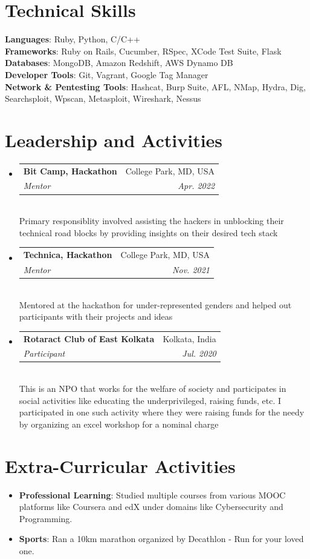 \documentclass[letterpaper,11pt]{article}
\makeatletter
\newcommand{\resumeSubheading}[4]{
  \vspace{-2pt}\item
    \begin{tabular*}{0.97\textwidth}[t]{l@{\extracolsep{\fill}}r}
      \textbf{#1} & #2 \\
      \textit{\small#3} & \textit{\small #4} \\
    \end{tabular*}\vspace{-7pt}
}
\newcommand{\resumeSubHeadingListStart}{\begin{itemize}[leftmargin=0.15in, label={}]}
\newcommand{\resumeSubHeadingListEnd}{\end{itemize}}
\makeatother
\begin{document}
\section{Technical Skills}
 \begin{itemize}[leftmargin=0.15in, label={}]
    \small{\item{
     \textbf{Languages}{: Ruby, Python, C/C++ } \\
     \textbf{Frameworks}{: Ruby on Rails, Cucumber, RSpec, XCode Test Suite, Flask } \\
     \textbf{Databases}{: MongoDB, Amazon Redshift, AWS Dynamo DB } \\
     \textbf{Developer Tools}{: Git, Vagrant, Google Tag Manager } \\
     \textbf{Network \& Pentesting Tools}{: Hashcat, Burp Suite, AFL, NMap, Hydra, Dig, Searchsploit, Wpscan, Metasploit, Wireshark, Nessus }
    }}
 \end{itemize}

\section{Leadership and Activities}
 \resumeSubHeadingListStart
  \resumeSubheading
     {Bit Camp, Hackathon}{College Park, MD, USA}
     {Mentor}{Apr. 2022} \vspace{2px} \\
     {Primary responsiblity involved assisting the hackers in unblocking their technical road blocks by providing insights on their desired tech stack}
  \resumeSubheading
     {Technica, Hackathon}{College Park, MD, USA}
     {Mentor}{Nov. 2021} \vspace{2px} \\
     {Mentored at the hackathon for under-represented genders and helped out participants with their projects and ideas}
  \resumeSubheading
     {Rotaract Club of East Kolkata}{Kolkata, India}
     {Participant}{Jul. 2020} \vspace{2px} \\
     {This is an NPO that works for the welfare of society and participates in social activities like educating the underprivileged, raising funds, etc. I participated in one such activity where they were raising funds for the needy by organizing an excel workshop for a nominal charge}
 \resumeSubHeadingListEnd

\section{Extra-Curricular Activities}
 \begin{itemize}
     \item { \textbf {Professional Learning}{: Studied multiple courses from various MOOC platforms like Coursera and edX under domains like Cybersecurity and Programming.}}
     \item {\textbf {Sports}{: Ran a 10km marathon organized by Decathlon - Run for your loved one.}}
 \end{itemize}

\end{document}
